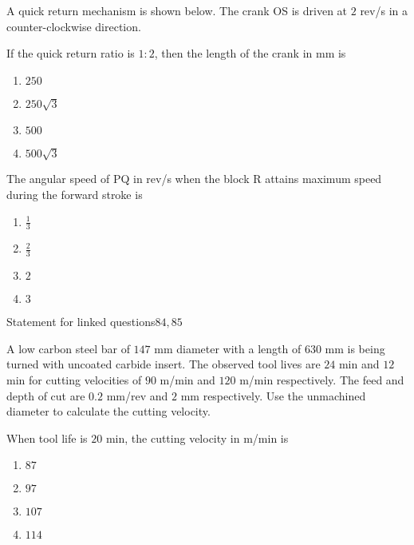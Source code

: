                           A quick return mechanism is shown below. The crank OS is driven at $2$ rev/s in a counter-clockwise direction.
                        
                         \item If the quick return ratio is $1:2$, then the length of the crank in mm is
                            \begin{enumerate}
                               \item  $250$
                               \item  $250 \sqrt{3}$
                                \item $500$
                                \item $500 \sqrt{3}$
                            \end{enumerate}
                           \item The angular speed of PQ in rev/s when the block R attains maximum speed during the forward stroke  is
                            \begin{enumerate}
                               \item  $\frac{1}{3}$
                               \item  $\frac{2}{3}$
                               \item  $2$
                               \item  $3$
                            \end{enumerate}
                        Statement for linked questions$84 , 85$
                        
                         A low carbon steel bar of $147$ mm diameter with a length of $630$ mm is being turned with uncoated carbide insert. The observed tool lives are $24$ min and $12$ min for cutting velocities of $90$ m/min and $120$ m/min respectively. The feed and depth of cut are $0.2$ mm/rev and $2$ mm respectively. Use the unmachined diameter to calculate the cutting velocity.
                         \item When tool life is $20$ min, the cutting velocity in m/min is
                            \begin{enumerate}
                               \item  $87$ 
                               \item  $97$ 
                                \item $107$ 
                                \item $114$
                            \end{enumerate}
                        
